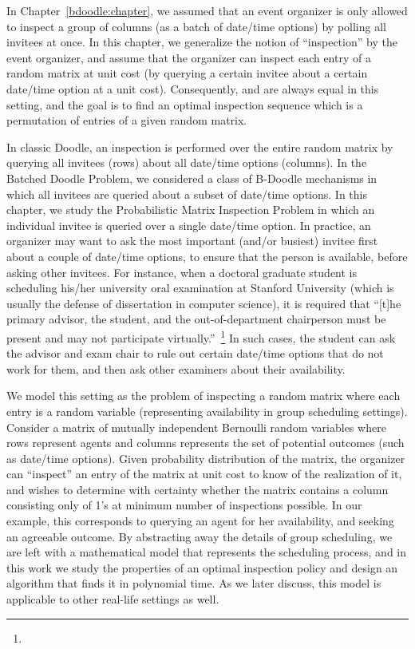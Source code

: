\label{matrix:chapter}


In Chapter~\ref{bdoodle:chapter}, we assumed that an event organizer is only allowed to inspect a group of columns (as a batch of date/time options) by polling all invitees at once.
In this chapter, we generalize the notion of ``inspection'' by the event organizer, and assume that the organizer can inspect each entry of a random matrix at unit cost (by querying a certain invitee about a certain date/time option at a unit cost).
Consequently, \Times and \Inconveniences are always equal in this setting, and the goal is to find an optimal inspection sequence which is a permutation of entries of a given random matrix.

In classic Doodle, an inspection is performed over the entire random matrix by querying all invitees (rows) about all date/time options (columns).
In the Batched Doodle Problem, we considered a class of B-Doodle mechanisms in which all invitees are queried about a subset of date/time options.
In this chapter, we study the Probabilistic Matrix Inspection Problem in which an individual invitee is queried over a single date/time option. In practice, an organizer may want to ask the most important (and/or busiest) invitee first about a couple of date/time options, to ensure that the person is available, before asking other invitees. For instance, when a doctoral graduate student is scheduling his/her university oral examination at Stanford University (which is usually the defense of dissertation in computer science), it is required that
``[t]he primary advisor, the student, and the out-of-department chairperson must be present and may not participate virtually.''~\footnote{

}
In such cases, the student can ask the advisor and exam chair to rule out certain date/time options that do not work for them, and then ask other examiners about their availability. 

We model this setting as the problem of inspecting a random matrix where each entry is a random variable (representing availability in group scheduling settings). 
Consider a matrix of mutually independent Bernoulli random variables where rows represent agents and columns represents the set of potential outcomes (such as date/time options). 
Given probability distribution of the matrix, the organizer can ``inspect'' an entry of the matrix at unit cost to know of the realization of it, and wishes to determine with certainty whether the matrix contains a column consisting only of 1's at minimum number of inspections possible. In our example, this corresponds to querying an agent for her availability, and seeking an agreeable outcome.
By abstracting away the details of group scheduling, we are left with a mathematical model that represents the scheduling process, and in this work we study the properties of an optimal inspection policy and design an algorithm that finds it in polynomial time. As we later discuss, this model is applicable to other real-life settings as well.

